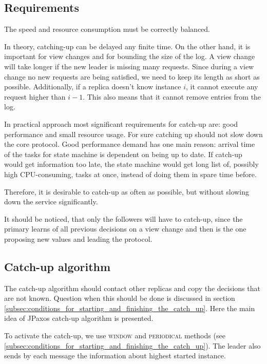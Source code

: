 \subsection{Requirements}
\label{subsec:catch_up_requirements}
The speed and resource consumption must be correctly balanced.

In theory, catching-up can be delayed any finite time. On the other hand, it is important for view changes and for bounding the size of the log. A view change will take longer if the new leader is missing many requests. Since during a view change no new requests are being satisfied, we need to keep its length as short as possible. Additionally, if a replica doesn't know instance $i$, it cannot execute any request higher than $i-1$. This also means that it cannot remove entries from the log.

In practical approach most significant requirements for catch-up are: good performance and small resource usage. For sure catching up should not slow down the core protocol.
Good performance demand has one main reason: arrival time of the tasks for state machine is dependent on being up to date. If catch-up would get information too late, the state machine would get long list of, possibly high CPU-consuming, tasks at once, instead of doing them in spare time before.

Therefore, it is desirable to catch-up as often as possible, but without slowing down the service significantly.

It should be noticed, that only the followers will have to catch-up, since the primary learns of all previous decisions on a view change and then is the one proposing new values and leading the protocol.

\subsection{Catch-up algorithm}
\label{subsec:catch_up_algorithm}
The catch-up algorithm should contact other replicas and copy the decisions that are not known. Question when this should be done is discussed in section \ref{subsec:conditions_for_starting_and_finishing_the_catch_up}. Here the main idea of JPaxos catch-up algorithm is presented.

To activate the catch-up, we use \textsc{window} and \textsc{periodical} methods (see \ref{subsec:conditions_for_starting_and_finishing_the_catch_up}). The leader also sends by each \alive message the information about highest started instance.

